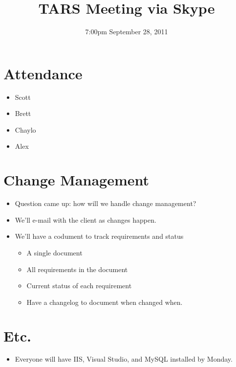 \documentclass{article}
\begin{document}
\title{TARS Meeting via Skype}
\date{7:00pm September 28, 2011}
\maketitle

\section{Attendance}
\begin{itemize}
\item Scott
\item Brett
\item Chaylo
\item Alex
\end{itemize}

\section{Change Management}
\begin{itemize}
\item Question came up: how will we handle change management?
\item We'll e-mail with the client as changes happen.
\item We'll have a codument to track requirements and status
	\begin{itemize}
	\item A single document
	\item All requirements in the document
	\item Current status of each requirement
	\item Have a changelog to document when changed when.
	\end{itemize}
\end{itemize}

\section{Etc.}
\begin{itemize}
\item Everyone will have IIS, Visual Studio, and MySQL installed by Monday.
\end{itemize}
\end{document}
